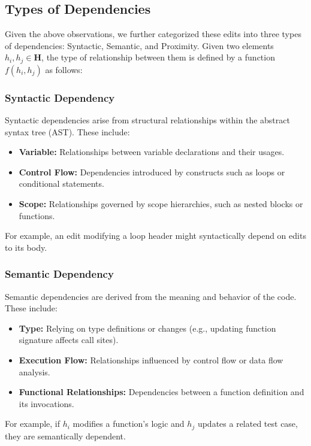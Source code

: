 
\subsection{Types of Dependencies}

Given the above observations, we further categorized these edits into three types of dependencies: Syntactic, Semantic, and Proximity. Given two elements \( h_i, h_j \in \mathbf{H} \), the type of relationship between them is defined by a function \( f(h_i, h_j) \) as follows:

\subsubsection{Syntactic Dependency}
Syntactic dependencies arise from structural relationships within the abstract syntax tree (AST). These include:
\begin{itemize}
    \item \textbf{Variable:} Relationships between variable declarations and their usages.
    \item \textbf{Control Flow:} Dependencies introduced by constructs such as loops or conditional statements.
    \item \textbf{Scope:} Relationships governed by scope hierarchies, such as nested blocks or functions.
\end{itemize}
For example, an edit modifying a loop header might syntactically depend on edits to its body.

\subsubsection{Semantic Dependency}
Semantic dependencies are derived from the meaning and behavior of the code. These include:
\begin{itemize}
    \item \textbf{Type:} Relying on type definitions or changes (e.g., updating function signature affects call sites).
    \item \textbf{Execution Flow:} Relationships influenced by control flow or data flow analysis.
    \item \textbf{Functional Relationships:} Dependencies between a function definition and its invocations.
\end{itemize}
For example, if \( h_i \) modifies a function’s logic and \( h_j \) updates a related test case, they are semantically dependent.

